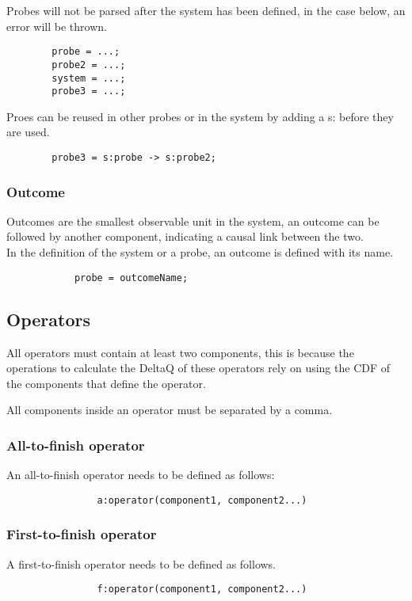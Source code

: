     Probes will not be parsed after the system has been defined, in the case below, an error will be thrown.
    \begin{verbatim}
        probe = ...;
        probe2 = ...;
        system = ...;
        probe3 = ...;
    \end{verbatim}
    
    Proes can be reused in other probes or in the system by adding a s: before they are used.
    \begin{verbatim}
        probe3 = s:probe -> s:probe2;
    \end{verbatim}
    \subsubsection{Outcome}
        Outcomes are the smallest observable unit in the system, an outcome can be followed by another component, indicating a causal link between the two. \\
        In the definition of the system or a probe, an outcome is defined with its name.
        \begin{verbatim}
            probe = outcomeName;
        \end{verbatim}

    \subsection{Operators}
        
        All operators must contain at least two components, this is because the operations to calculate the DeltaQ of these operators rely on using the CDF of the components that define the operator.

    All components inside an operator must be separated by a comma.
        \subsubsection{All-to-finish operator}
            An all-to-finish operator needs to be defined as follows:
            \begin{verbatim}
                a:operator(component1, component2...)
            \end{verbatim}

        \subsubsection{First-to-finish operator}
            A first-to-finish operator needs to be defined as follows.
            \begin{verbatim}
                f:operator(component1, component2...)
            \end{verbatim} 

